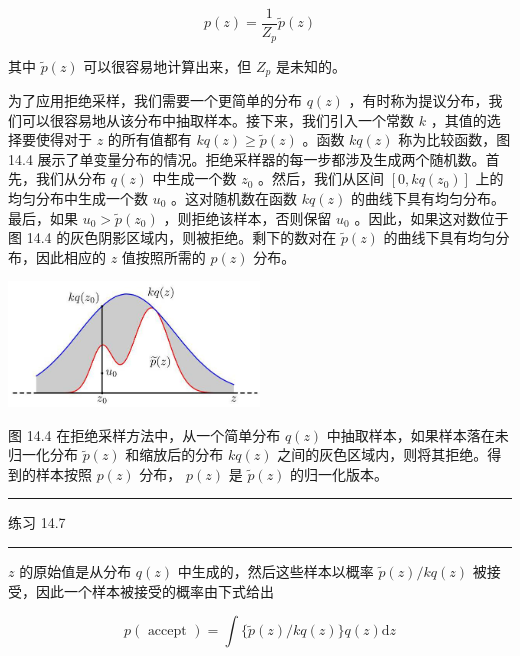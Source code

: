 \documentclass[10pt]{article}
\newcommand{\HRule}{\begin{center}\rule{0.9\linewidth}{0.2mm}\end{center}}
\begin{document}
\[
p\left( z\right)  = \frac{1}{{Z}_{p}}\widetilde{p}\left( z\right)  \tag{14.13}
\]

其中 \(\widetilde{p}\left( z\right)\) 可以很容易地计算出来，但 \({Z}_{p}\) 是未知的。

为了应用拒绝采样，我们需要一个更简单的分布 \(q\left( z\right)\) ，有时称为提议分布，我们可以很容易地从该分布中抽取样本。接下来，我们引入一个常数 \(k\) ，其值的选择要使得对于 \(z\) 的所有值都有 \({kq}\left( z\right)  \geq  \widetilde{p}\left( z\right)\) 。函数 \({kq}\left( z\right)\) 称为比较函数，图 14.4 展示了单变量分布的情况。拒绝采样器的每一步都涉及生成两个随机数。首先，我们从分布 \(q\left( z\right)\) 中生成一个数 \({z}_{0}\) 。然后，我们从区间 \(\left\lbrack  {0,{kq}\left( {z}_{0}\right) }\right\rbrack\) 上的均匀分布中生成一个数 \({u}_{0}\) 。这对随机数在函数 \({kq}\left( z\right)\) 的曲线下具有均匀分布。最后，如果 \({u}_{0} > \widetilde{p}\left( {z}_{0}\right)\) ，则拒绝该样本，否则保留 \({u}_{0}\) 。因此，如果这对数位于图 14.4 的灰色阴影区域内，则被拒绝。剩下的数对在 \(\widetilde{p}\left( z\right)\) 的曲线下具有均匀分布，因此相应的 \(z\) 值按照所需的 \(p\left( z\right)\) 分布。

\begin{center}
\includegraphics[max width=0.5\textwidth]{images/0194e279-9b28-703a-88f4-c3ac21e2010d_453_896_342_657_328_0.jpg}
\end{center}
\hspace*{3em} 

图 14.4 在拒绝采样方法中，从一个简单分布 \(q\left( z\right)\) 中抽取样本，如果样本落在未归一化分布 \(\widetilde{p}\left( z\right)\) 和缩放后的分布 \({kq}\left( z\right)\) 之间的灰色区域内，则将其拒绝。得到的样本按照 \(p\left( z\right)\) 分布， \(p\left( z\right)\) 是 \(\widetilde{p}\left( z\right)\) 的归一化版本。

\HRule

练习 14.7

\HRule

\(z\) 的原始值是从分布 \(q\left( z\right)\) 中生成的，然后这些样本以概率 \(\widetilde{p}\left( z\right) /{kq}\left( z\right)\) 被接受，因此一个样本被接受的概率由下式给出

\[
p\left( \text{ accept }\right)  = \int \{ \widetilde{p}\left( z\right) /{kq}\left( z\right) \} q\left( z\right) \mathrm{d}z
\]
\end{document}
